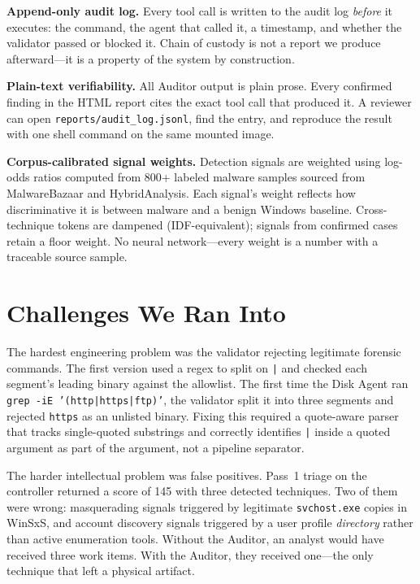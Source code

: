 \documentclass[10pt, letterpaper]{article}
\begin{document}
\textbf{Append-only audit log.} Every tool call is written to the audit
log \emph{before} it executes: the command, the agent that called it,
a timestamp, and whether the validator passed or blocked it. Chain of
custody is not a report we produce afterward---it is a property of the
system by construction.

\textbf{Plain-text verifiability.} All Auditor output is plain prose.
Every confirmed finding in the HTML report cites the exact tool call
that produced it. A reviewer can open \texttt{reports/audit\_log.jsonl},
find the entry, and reproduce the result with one shell command on the
same mounted image.

\textbf{Corpus-calibrated signal weights.} Detection signals are weighted
using log-odds ratios computed from 800+ labeled malware samples sourced
from MalwareBazaar and HybridAnalysis. Each signal's weight reflects
how discriminative it is between malware and a benign Windows baseline.
Cross-technique tokens are dampened (IDF-equivalent); signals from confirmed
cases retain a floor weight. No neural network---every weight is a number
with a traceable source sample.

\section{Challenges We Ran Into}

The hardest engineering problem was the validator rejecting legitimate
forensic commands. The first version used a regex to split on \texttt{|}
and checked each segment's leading binary against the allowlist. The
first time the Disk Agent ran \texttt{grep -iE '(http|https|ftp)'},
the validator split it into three segments and rejected \texttt{https}
as an unlisted binary. Fixing this required a quote-aware parser that
tracks single-quoted substrings and correctly identifies \texttt{|} inside
a quoted argument as part of the argument, not a pipeline separator.

The harder intellectual problem was false positives. Pass~1 triage on the
controller returned a score of 145 with three detected techniques.
Two of them were wrong: masquerading signals triggered by legitimate
\texttt{svchost.exe} copies in WinSxS, and account discovery signals
triggered by a user profile \emph{directory} rather than active
enumeration tools. Without the Auditor, an analyst would have received
three work items. With the Auditor, they received one---the only technique
that left a physical artifact.
\end{document}
